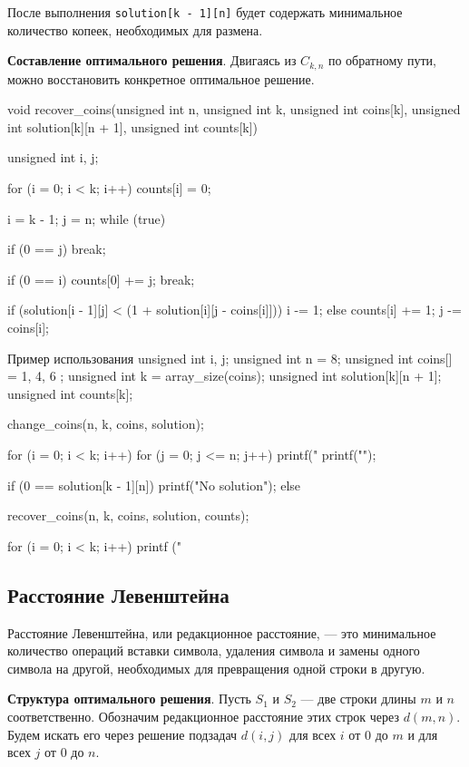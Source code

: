 После выполнения \lstinline{solution[k - 1][n]} будет содержать минимальное количество копеек, необходимых для размена.

\textbf{Составление оптимального решения}. Двигаясь из $C_{k, n}$ по обратному пути, можно восстановить конкретное оптимальное решение.

\begin{clst}{}{}
void recover_coins(unsigned int n, unsigned int k, unsigned int coins[k],
                   unsigned int solution[k][n + 1], unsigned int counts[k])
{
    unsigned int i, j;

    for (i = 0; i < k; i++)
        counts[i] = 0;

    i = k - 1;
    j = n;
    while (true) {
        if (0 == j)
            break;

        if (0 == i) {
            counts[0] += j;
            break;
        }

        if (solution[i - 1][j] < (1 + solution[i][j - coins[i]]))
            i -= 1;
        else {
            counts[i] += 1;
            j -= coins[i];
        }
    }
}
\end{clst}

\begin{clst}{Пример использования}{}
unsigned int i, j;
unsigned int n = 8;
unsigned int coins[] = { 1, 4, 6 };
unsigned int k = array_size(coins);
unsigned int solution[k][n + 1];
unsigned int counts[k];

change_coins(n, k, coins, solution);

for (i = 0; i < k; i++) {
    for (j = 0; j <= n; j++)
        printf("%
    printf("\n");
}

if (0 == solution[k - 1][n])
    printf("No solution\n");
else {
    recover_coins(n, k, coins, solution, counts);

    for (i = 0; i < k; i++)
        printf ("%
}
\end{clst}

\subsection{Расстояние Левенштейна}
Расстояние Левенштейна, или редакционное расстояние, — это минимальное количество операций вставки символа, удаления символа и замены одного символа на другой, необходимых для превращения одной строки в другую.

\textbf{Структура оптимального решения}. Пусть $S_1$ и $S_2$ --- две строки длины $m$ и $n$ соответственно. Обозначим редакционное расстояние этих строк через $d(m, n)$. Будем искать его через решение подзадач $d(i, j)$ для всех $i$ от $0$ до $m$ и для всех $j$ от $0$ до $n$.

